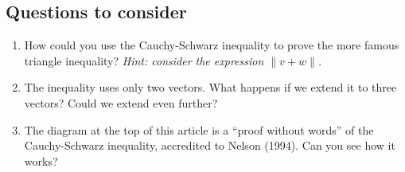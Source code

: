 \documentclass{article}
\begin{document}
\subsection*{Questions to consider}
\begin{enumerate}
  \item How could you use the Cauchy-Schwarz inequality to prove the more famous triangle inequality? \textit{Hint: consider the expression $\|v+w\|$.}
  \item The inequality uses only two vectors. What happens if we extend it to three vectors? Could we extend even further?
  \item The diagram at the top of this article is a “proof without words” of the Cauchy-Schwarz inequality, accredited to Nelson (1994). Can you see how it works?
\end{enumerate}
\end{document}
